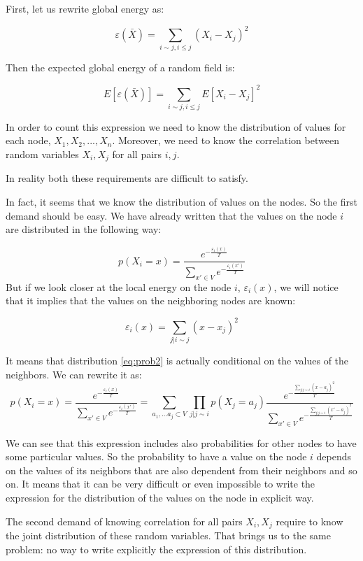 \documentclass[12pt]{report}
\begin{document}
First, let us rewrite global energy as:


$$ \varepsilon (\bar{X}) =  \sum_{i \sim j, i \leq j} (X_i - X_j)^2  $$

Then the expected global energy of a random field is:

$$ E[\varepsilon (\bar{X})] =  \sum_{i \sim j, i \leq j} E[X_i - X_j]^2  $$

In order to count this expression we need to know the distribution of values for each node, $X_1, X_2, ..., X_n$. Moreover, we need to know the correlation between random variables $X_i, X_j$ for all pairs  $i, j$.

In reality both these requirements are difficult to satisfy.

In fact, it seems that we know the distribution of values on the nodes. So the first demand should be easy. We have already written that the values on the node $i$ are distributed in the following way:

\begin{equation}
\label{eq:prob2} 
p(X_i = x) = \frac{ e^{-\frac{\varepsilon_i(x)}{T}} }{ \sum\limits_{x'\in V} e^{-\frac{\varepsilon_i(x')}{T}}}
\end{equation}
But if we look closer at the local energy on the node $i$, $\varepsilon_i(x)$, we will notice that it implies that the values on the neighboring nodes are known:

 $$\varepsilon_i(x) = \sum\limits_{j | i \sim j} (x - x_j)^2 $$
  
It means that distribution \ref{eq:prob2} is actually conditional on the values of the neighbors. We can rewrite it as:
$$ p(X_i = x) = \frac{ e^{-\frac{\varepsilon_i(x)}{T}} }{ \sum\limits_{x'\in V} e^{-\frac{\varepsilon_i(x')}{T}}}  = 
\sum\limits_{a_1, ... a_j \subset V} \prod\limits_{j|j \sim i} p(X_j  = a_j)
\frac{ e^{-\frac{ \sum\limits_{j|j \sim i}(x - a_j)^2 }{T}} }{ \sum\limits_{x'\in V} e^{-\frac{ \sum\limits_{j|j \sim i}(x' - a_j)^2 }{T}}}  $$

We can see that this expression includes also probabilities for other nodes to have some particular values. So the probability to have a value on the node $i$ depends on the values of its neighbors that are also dependent from their neighbors and so on. It means that it can be very difficult or even impossible to write the expression for the distribution of the values on the node in explicit way.

The second demand of knowing correlation for all pairs $X_i, X_j$ require to know the joint distribution of these random variables. That brings us to the same problem: no way to write explicitly the expression of this distribution.
\end{document}
